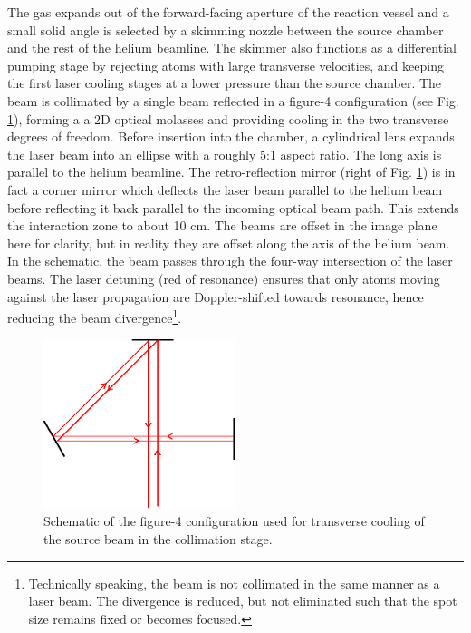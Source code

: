 	The gas expands out of the forward-facing aperture of the reaction vessel and a small solid angle is selected by a skimming nozzle between the source chamber and the rest of the helium beamline.
	The skimmer also functions as a differential pumping stage by rejecting atoms with large transverse velocities, and keeping the first laser cooling stages at a lower pressure than the source chamber.
	The beam is collimated by a single beam reflected in a figure-4 configuration (see Fig. \ref{fig:figure_4}), forming a a 2D optical molasses \cite{Lett81,Rooijakkers96} and providing cooling in the two transverse degrees of freedom.
	Before insertion into the chamber, a cylindrical lens expands the laser beam into an ellipse with a roughly 5:1 aspect ratio. The long axis is parallel to the helium beamline. The retro-reflection mirror (right of Fig. \ref{fig:figure_4}) is in fact a corner mirror which deflects the laser beam parallel to the helium beam before reflecting it back parallel to the incoming optical beam path.  
	This extends the interaction zone to about 10 cm. 
	The beams are offset in the image plane here for clarity, but in reality they are offset along the axis of the helium beam.
	In the schematic, the beam passes through the four-way intersection of the laser beams. 
	The laser detuning (red of resonance) ensures that only atoms moving against the laser propagation are Doppler-shifted towards resonance, hence reducing the beam divergence\footnote{Technically speaking, the beam is not collimated in the same manner as a laser beam.
	The divergence is reduced, but not eliminated such that the spot size remains fixed or becomes focused.}.
	\begin{figure}
		\centering
		\includegraphics[width=0.5\textwidth]{fig/apparatus/figure_4_beams}
		\caption{Schematic of the figure-4 configuration used for transverse cooling of the source beam in the collimation stage. }
		\label{fig:figure_4}
	\end{figure}



